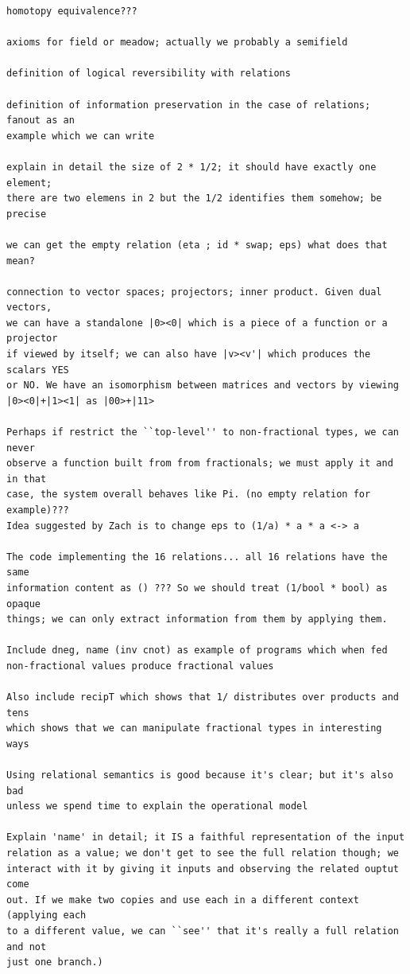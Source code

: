 \documentclass{llncs}
\begin{document}
\begin{verbatim}
homotopy equivalence???

axioms for field or meadow; actually we probably a semifield

definition of logical reversibility with relations

definition of information preservation in the case of relations; fanout as an
example which we can write

explain in detail the size of 2 * 1/2; it should have exactly one element;
there are two elemens in 2 but the 1/2 identifies them somehow; be precise

we can get the empty relation (eta ; id * swap; eps) what does that mean? 

connection to vector spaces; projectors; inner product. Given dual vectors,
we can have a standalone |0><0| which is a piece of a function or a projector
if viewed by itself; we can also have |v><v'| which produces the scalars YES
or NO. We have an isomorphism between matrices and vectors by viewing 
|0><0|+|1><1| as |00>+|11>

Perhaps if restrict the ``top-level'' to non-fractional types, we can never
observe a function built from from fractionals; we must apply it and in that
case, the system overall behaves like Pi. (no empty relation for example)???
Idea suggested by Zach is to change eps to (1/a) * a * a <-> a

The code implementing the 16 relations... all 16 relations have the same
information content as () ??? So we should treat (1/bool * bool) as opaque
things; we can only extract information from them by applying them.

Include dneg, name (inv cnot) as example of programs which when fed
non-fractional values produce fractional values

Also include recipT which shows that 1/ distributes over products and tens
which shows that we can manipulate fractional types in interesting ways

Using relational semantics is good because it's clear; but it's also bad
unless we spend time to explain the operational model

Explain 'name' in detail; it IS a faithful representation of the input
relation as a value; we don't get to see the full relation though; we
interact with it by giving it inputs and observing the related ouptut come
out. If we make two copies and use each in a different context (applying each
to a different value, we can ``see'' that it's really a full relation and not
just one branch.) 


\end{verbatim}
\end{document}
